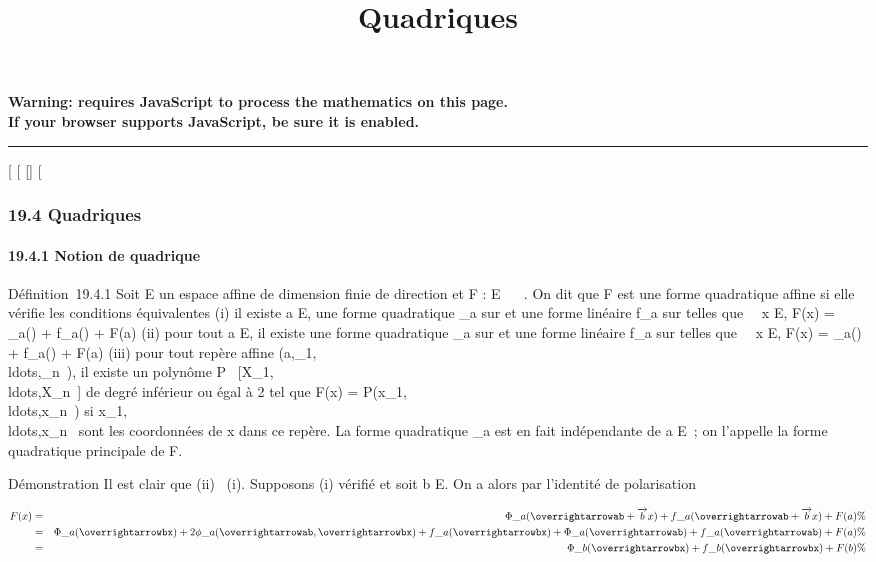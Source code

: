 \documentclass[]{article}
\title{Quadriques}
\author{}
\date{}
\begin{document}
\maketitle

\textbf{Warning: 
requires JavaScript to process the mathematics on this page.\\ If your
browser supports JavaScript, be sure it is enabled.}

\begin{center}\rule{3in}{0.4pt}\end{center}

{[}
{[}
{[}{]}
{[}

\subsubsection{19.4 Quadriques}

\paragraph{19.4.1 Notion de quadrique}

Définition~19.4.1 Soit E un espace affine de dimension finie de
direction \vecE et F : E \rightarrow~ ~. On dit que F est une
forme quadratique affine si elle vérifie les conditions équivalentes (i)
il existe a \in E, une forme quadratique \Phi\_a sur
\vecE et une forme linéaire f\_a sur
\vecE telles que \forall~~x \in E,
F(x) = \Phi\_a(\overrightarrowax) +
f\_a(\overrightarrowax) + F(a) (ii) pour tout
a \in E, il existe une forme quadratique \Phi\_a sur
\vecE et une forme linéaire f\_a sur
\vecE telles que \forall~~x \in E,
F(x) = \Phi\_a(\overrightarrowax) +
f\_a(\overrightarrowax) + F(a) (iii) pour
tout repère affine
(a,\overrightarrowe\_1,\\ldots,\overrightarrowe\_n~),
il existe un polynôme P \in
{}~{[}X\_1,\\ldots,X\_n~{]}
de degré inférieur ou égal à 2 tel que F(x) =
P(x\_1,\\ldots,x\_n~)
si
x\_1,\\ldots,x\_n~
sont les coordonnées de x dans ce repère. La forme quadratique
\Phi\_a est en fait indépendante de a \in E~; on l'appelle la forme
quadratique principale de F.

Démonstration Il est clair que (ii) \rigtharrow~(i). Supposons (i) vérifié et soit
b \in E. On a alors par l'identité de polarisation

\begin{align*} F(x)& =&
\Phi\_a(\overrightarrowab
+\overrightarrow bx) +
f\_a(\overrightarrowab
+\overrightarrow bx) + F(a) \%&
\\ & =&
\Phi\_a(\overrightarrowbx) +
2\phi\_a(\overrightarrowab,\overrightarrowbx)
+ f\_a(\overrightarrowbx) +
\Phi\_a(\overrightarrowab) +
f\_a(\overrightarrowab) + F(a)\%&
\\ & =&
\Phi\_b(\overrightarrowbx) +
f\_b(\overrightarrowbx) + F(b) \%&
\\ \end{align*}
\end{document}
